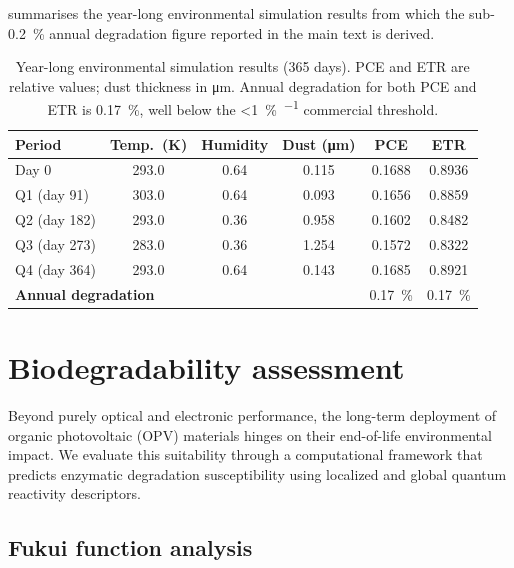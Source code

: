 \documentclass[11pt,a4paper]{article}
\begin{document}
 summarises the year-long environmental simulation results from which the sub-\SI{0.2}{\percent} annual degradation figure reported in the main text is derived.

\begin{table}[ht]
\centering
\caption{Year-long environmental simulation results (365 days). PCE and ETR are relative values; dust thickness in \si{\micro\metre}. Annual degradation for both PCE and ETR is \SI{0.17}{\percent}, well below the \SI{<1}{\percent\per\yr} commercial threshold.}
\label{tab:environmental_effects}
\begin{tabular}{lccccc}
\toprule
\textbf{Period} & \textbf{Temp.\ (K)} & \textbf{Humidity} & \textbf{Dust (\si{\micro\metre})} & \textbf{PCE} & \textbf{ETR} \\
\midrule
Day 0   & 293.0 & 0.64 & 0.115 & 0.1688 & 0.8936 \\
Q1 (day 91) & 303.0 & 0.64 & 0.093 & 0.1656 & 0.8859 \\
Q2 (day 182) & 293.0 & 0.36 & 0.958 & 0.1602 & 0.8482 \\
Q3 (day 273) & 283.0 & 0.36 & 1.254 & 0.1572 & 0.8322 \\
Q4 (day 364) & 293.0 & 0.64 & 0.143 & 0.1685 & 0.8921 \\
\midrule
\multicolumn{4}{l}{\textbf{Annual degradation}} & \SI{0.17}{\percent} & \SI{0.17}{\percent} \\
\bottomrule
\end{tabular}
\end{table}

\section{Biodegradability assessment}\label{si:biodegradability}

Beyond purely optical and electronic performance, the long-term deployment of organic photovoltaic (OPV) materials hinges on their end-of-life environmental impact. We evaluate this suitability through a computational framework that predicts enzymatic degradation susceptibility using localized and global quantum reactivity descriptors.

\subsection{Fukui function analysis}
\end{document}
